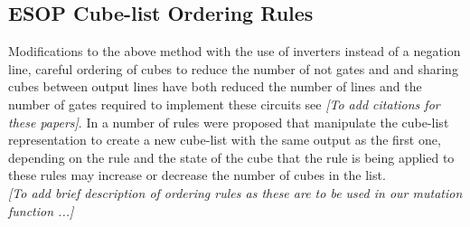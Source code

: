 \subsection{ESOP Cube-list Ordering Rules}


Modifications to the above method with the use of inverters instead of a negation line, careful ordering 
of cubes to reduce the number of not gates and and sharing cubes between output lines have both reduced 
the number of lines and the number of gates required to implement these circuits see \emph{[To add citations for these papers]}.  
In \cite{Nayeem2011} a number of rules were proposed that manipulate the cube-list representation to create a new cube-list with 
the same output as the first one, 
depending on the rule and the state of the cube that the rule is being applied to these rules may increase 
or decrease the number of cubes in the list.\\


\noindent \emph{[To add brief description of ordering rules as these are to be used in our mutation function ...]}
